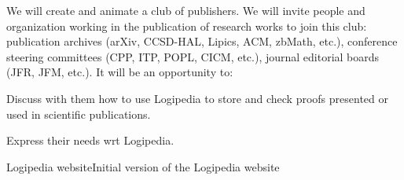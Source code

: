 \begin{workpackage}[id=dissemination,wphases=0-48,type=MGT,
  short=Dissemination,%
  title={Dissemination, communication and exploitation},
  lead=Inr]
\begin{tasklist}
  \begin{task}[id=publishers-club,
      title=Expanding the use of Logipedia in publishing,
      lead=Zib,ZibRM=14]
    We will create and animate a club of publishers. We will invite
    people and organization working in the publication of research
    works to join this club: publication archives (arXiv, CCSD-HAL,
    Lipics, ACM, zbMath, etc.), conference steering committees (CPP,
    ITP, POPL, CICM, etc.), journal editorial boards (JFR, JFM,
    etc.). It will be an opportunity to:
    \begin{compactitem}
    \item Discuss with them how to use Logipedia to store and check
      proofs presented or used in scientific publications.
    \item Express their needs wrt Logipedia.
    \end{compactitem}
  \end{task}

\end{tasklist}

\begin{wpdelivs}
  
  \begin{wpdeliv}[due=1,miles=startup,id=requirements,dissem=PU,nature=DEC,lead=Inr]{Logipedia website}Initial version of the Logipedia website
  \end{wpdeliv}

\end{wpdelivs}

\end{workpackage}


